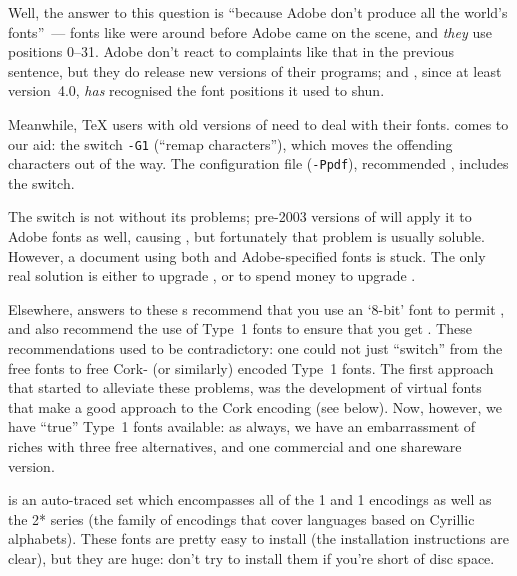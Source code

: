Well, the answer to this question is ``because Adobe don't produce all
the world's fonts''~--- fonts like 
 were around before Adobe came on the scene, and
\emph{they} use positions 0--31.  Adobe don't react to complaints like
that in the previous sentence, but they do release new versions of
their programs; and , since at least version~4.0,
\emph{has} recognised the font positions it used to shun.

Meanwhile, \TeX{} users with old versions of  need
to deal with their fonts.   comes to our aid: the
switch \texttt{-G1} (``remap characters''), which moves the offending
characters out of the way.  The  configuration file
(\texttt{-Ppdf}), recommended %
,
includes the switch.

The switch is not without its problems; pre-2003 versions of
 will apply it to Adobe fonts as well, causing
, but fortunately
that problem is usually soluble.  However, a document using both
 and Adobe-specified fonts is stuck.  The only real solution
is either to upgrade , or to spend money to upgrade
.


Elsewhere, answers to these s recommend that you use an
`8-bit' font to permit %
,
and also recommend the use of Type~1 fonts to ensure that
you get .  These
recommendations used to be contradictory: one could not just
``switch'' from the free  fonts to free Cork- (or similarly)
encoded Type~1 fonts.  The first approach that started to alleviate
these problems, was the development of virtual fonts that make
a good approach to the Cork encoding (see below).  Now, however, we
have ``true'' Type~1 fonts available: as always, we have an
embarrassment of riches with three free alternatives, and one
commercial and one shareware version.

 is an
auto-traced set which encompasses all of the 1 and 1
encodings as well as the 2* series (the family of encodings
that cover languages based on Cyrillic alphabets).  These fonts are
pretty easy to install (the installation instructions are clear), but
they are huge: don't try to install them if you're short of disc
space.

